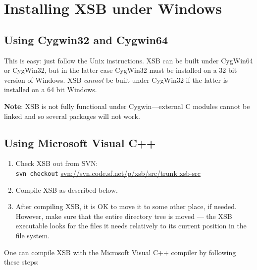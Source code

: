 \section{Installing XSB under Windows}
\subsection{Using Cygwin32 and Cygwin64}
\label{quick:cygwin}

This is easy: just follow the Unix instructions.
XSB can be built under CygWin64 or CygWin32, but in the latter case
CygWin32 must be installed on a 32 bit version of Windows.
XSB \emph{cannot} be built under CygWin32 if the latter is installed on a
64 bit Windows.

\noindent
\textbf{Note}: XSB is not fully functional under Cygwin---external C modules
cannot be linked and so several packages will not work.

\subsection{Using Microsoft Visual C++}
\label{quick:DOS}

\begin{enumerate}
\item Check XSB out from SVN:\\
  \texttt{svn checkout} \url{svn://svn.code.sf.net/p/xsb/src/trunk xsb-src}
\item Compile XSB as described below.
\item After compiling XSB, it is OK to move it to some other place, if needed.
   However, make sure that the
   entire directory tree is moved --- the XSB executable looks for the files it
   needs relatively to its current position in the file system.
\end{enumerate}


\noindent
One can compile XSB with the Microsoft Visual C++ compiler 
by following these steps:

